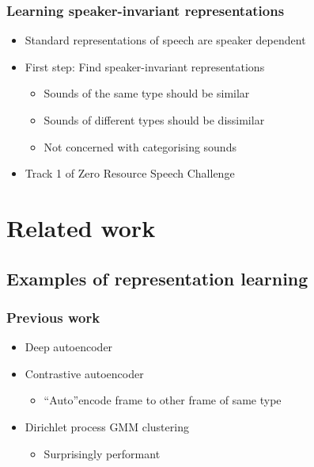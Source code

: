\documentclass[british]{beamer}
\begin{document}
  \begin{frame}
    \frametitle{Learning speaker-invariant representations}
    
    \begin{itemize}
     \item Standard representations of speech are speaker dependent
     \item First step: Find speaker-invariant representations
     \begin{itemize}
      \item Sounds of the same type should be similar
      \item Sounds of different types should be dissimilar
      \item Not concerned with categorising sounds
     \end{itemize}
     \item Track 1 of Zero Resource Speech Challenge
    \end{itemize}
    
  \end{frame}

  \section{Related work}
  \subsection{Examples of representation learning}
  
  \begin{frame}
    \frametitle{Previous work}
    
    \begin{itemize}
     \item Deep autoencoder
     \item Contrastive autoencoder
     \begin{itemize}
      \item ``Auto''encode frame to other frame of same type
     \end{itemize}
     \item Dirichlet process GMM clustering
     \begin{itemize}
      \item Surprisingly performant
     \end{itemize}
    \end{itemize}
    
  \end{frame}
  
\end{document}
